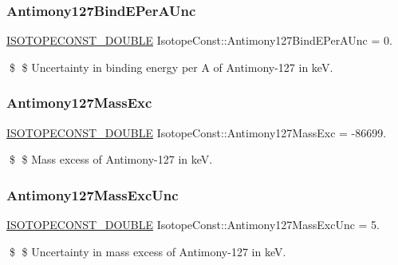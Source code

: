 \subsubsection{\texorpdfstring{Antimony127\+Bind\+E\+Per\+A\+Unc}{Antimony127BindEPerAUnc}}
{\footnotesize\ttfamily \mbox{\hyperlink{group___isotope_const-_macros_ga8f45a7272ce02c0b4c65c44636ed719a}{I\+S\+O\+T\+O\+P\+E\+C\+O\+N\+S\+T\+\_\+\+D\+O\+U\+B\+LE}} Isotope\+Const\+::\+Antimony127\+Bind\+E\+Per\+A\+Unc = 0.}

\$ \$ Uncertainty in binding energy per A of Antimony-\/127 in keV. \mbox{\label{group___isotope_const-_antimony-_sb127_ga0b531032effddab1e20d02c0e77b1d83}} 
\subsubsection{\texorpdfstring{Antimony127\+Mass\+Exc}{Antimony127MassExc}}
{\footnotesize\ttfamily \mbox{\hyperlink{group___isotope_const-_macros_ga8f45a7272ce02c0b4c65c44636ed719a}{I\+S\+O\+T\+O\+P\+E\+C\+O\+N\+S\+T\+\_\+\+D\+O\+U\+B\+LE}} Isotope\+Const\+::\+Antimony127\+Mass\+Exc = -\/86699.}

\$ \$ Mass excess of Antimony-\/127 in keV. \mbox{\label{group___isotope_const-_antimony-_sb127_ga0af72722e1e10e6b16acd553966ddadb}} 
\subsubsection{\texorpdfstring{Antimony127\+Mass\+Exc\+Unc}{Antimony127MassExcUnc}}
{\footnotesize\ttfamily \mbox{\hyperlink{group___isotope_const-_macros_ga8f45a7272ce02c0b4c65c44636ed719a}{I\+S\+O\+T\+O\+P\+E\+C\+O\+N\+S\+T\+\_\+\+D\+O\+U\+B\+LE}} Isotope\+Const\+::\+Antimony127\+Mass\+Exc\+Unc = 5.}

\$ \$ Uncertainty in mass excess of Antimony-\/127 in keV. \mbox{\label{group___isotope_const-_antimony-_sb127_ga3d56ec64ee00e1b0c030ad5a92e07c41}} 
